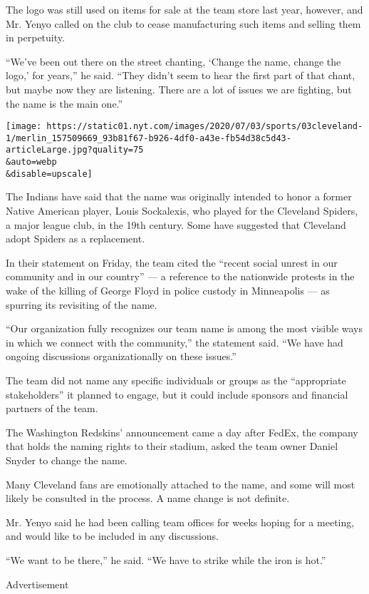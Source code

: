 The logo was still used on items for sale at the team store last year,
however, and Mr. Yenyo called on the club to cease manufacturing such
items and selling them in perpetuity.

``We've been out there on the street chanting, `Change the name, change
the logo,' for years,'' he said. ``They didn't seem to hear the first
part of that chant, but maybe now they are listening. There are a lot of
issues we are fighting, but the name is the main one.''

\texttt{[image: https://static01.nyt.com/images/2020/07/03/sports/03cleveland-1/merlin\_157509669\_93b81f67-b926-4df0-a43e-fb54d38c5d43-articleLarge.jpg?quality=75\\\&auto=webp\\\&disable=upscale]}

The Indians have said that the name was originally intended to honor a
former Native American player, Louis Sockalexis, who played for the
Cleveland Spiders, a major league club, in the 19th century. Some have
suggested that Cleveland adopt Spiders as a replacement.

In their statement on Friday, the team cited the ``recent social unrest
in our community and in our country'' --- a reference to the nationwide
protests in the wake of the killing of George Floyd in police custody in
Minneapolis --- as spurring its revisiting of the name.

``Our organization fully recognizes our team name is among the most
visible ways in which we connect with the community,'' the statement
said. ``We have had ongoing discussions organizationally on these
issues.''

The team did not name any specific individuals or groups as the
``appropriate stakeholders'' it planned to engage, but it could include
sponsors and financial partners of the team.

The Washington Redskins' announcement came a day after FedEx, the
company that holds the naming rights to their stadium, asked the team
owner Daniel Snyder to change the name.

Many Cleveland fans are emotionally attached to the name, and some will
most likely be consulted in the process. A name change is not definite.

Mr. Yenyo said he had been calling team offices for weeks hoping for a
meeting, and would like to be included in any discussions.

``We want to be there,'' he said. ``We have to strike while the iron is
hot.''

Advertisement


